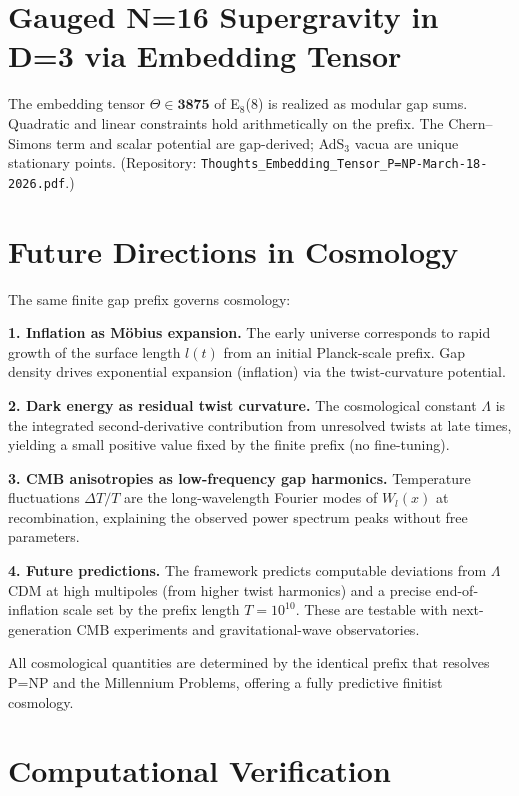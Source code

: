 \documentclass[11pt]{article}
\begin{document}
\section{Gauged N=16 Supergravity in D=3 via Embedding Tensor}

The embedding tensor $\Theta \in \mathbf{3875}$ of E$_8$(8) is realized as modular gap sums. Quadratic and linear constraints hold arithmetically on the prefix. The Chern–Simons term and scalar potential are gap-derived; AdS$_3$ vacua are unique stationary points. (Repository: \texttt{Thoughts\_Embedding\_Tensor\_P=NP-March-18-2026.pdf}.)

\section{Future Directions in Cosmology}

The same finite gap prefix governs cosmology:

\textbf{1. Inflation as Möbius expansion.} The early universe corresponds to rapid growth of the surface length $l(t)$ from an initial Planck-scale prefix. Gap density drives exponential expansion (inflation) via the twist-curvature potential.

\textbf{2. Dark energy as residual twist curvature.} The cosmological constant $\Lambda$ is the integrated second-derivative contribution from unresolved twists at late times, yielding a small positive value fixed by the finite prefix (no fine-tuning).

\textbf{3. CMB anisotropies as low-frequency gap harmonics.} Temperature fluctuations $\Delta T/T$ are the long-wavelength Fourier modes of $W_l(x)$ at recombination, explaining the observed power spectrum peaks without free parameters.

\textbf{4. Future predictions.} The framework predicts computable deviations from $\Lambda$CDM at high multipoles (from higher twist harmonics) and a precise end-of-inflation scale set by the prefix length $T=10^{10}$. These are testable with next-generation CMB experiments and gravitational-wave observatories.

All cosmological quantities are determined by the identical prefix that resolves P=NP and the Millennium Problems, offering a fully predictive finitist cosmology.

\section{Computational Verification}
\end{document}
